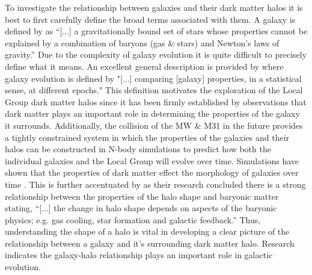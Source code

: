 \documentclass[usenatbib]{mnras}
\begin{document}
To investigate the relationship between galaxies and their dark matter halos it is best to first carefully define the broad terms associated with them. A galaxy is defined by \cite{Willman12} as ``[...] a gravitationally bound set of stars whose properties cannot be explained by a combination of baryons (gas \& stars) and Newton's laws of gravity.'' Due to the complexity of galaxy evolution it is quite difficult to precisely define what it means. An excellent general description is provided by \cite{Mo10} where galaxy evolution is defined by "[...] comparing [galaxy] properties, in a statistical sense, at different epochs." This definition motivates the exploration of the Local Group dark matter halos since it has been firmly established by observations that dark matter plays an important role in determining the properties of the galaxy it surrounds. Additionally, the collision of the MW \& M31 in the future provides a tightly constrained system in which the properties of the galaxies and their halos can be constructed in N-body simulations to predict how both the individual galaxies and the Local Group will evolve over time. Simulations have shown that the properties of dark matter effect the morphology of galaxies over time \citep{Cataldi21}. This is further accentuated by \cite{Chua22} as their research concluded there is a strong relationship between the properties of the halo shape and baryonic matter stating, ``[...] the change in halo shape depends on aspects of the baryonic physics; e.g. gas cooling, star formation and galactic feedback.'' Thus, understanding the shape of a halo is vital in developing a clear picture of the relationship between a galaxy and it's surrounding dark matter halo. Research indicates the galaxy-halo relationship plays an important role in galactic evolution.     
\end{document}
